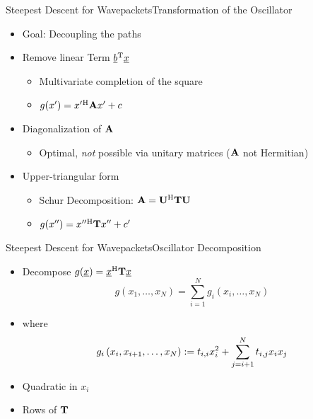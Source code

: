 \documentclass{beamer}
\newcommand{\cemph}[1]{\emph{\color{orange} #1}}
\begin{document}
\begin{frame}{Steepest Descent for Wavepackets}{Transformation of the Oscillator}
  \begin{itemize}
    \item Goal: Decoupling the paths
    \vspace{0.3cm}
    \item Remove linear Term $\underline{b}{}^{\textnormal{T}} \underline{x}$
    \begin{itemize}
      \item Multivariate completion of the square
      \item $g(x^\prime) = x^\prime{}^{\textnormal{H}} \mathbf{A} x^\prime + c$
    \end{itemize}
    \item Diagonalization of $\mathbf{A}$
    \begin{itemize}
      \item Optimal, \cemph{not} possible via unitary matrices ($\mathbf{A}$ not Hermitian)
    \end{itemize}
    \item Upper-triangular form
    \begin{itemize}
      \item Schur Decomposition: $\mathbf{A} = \mathbf{U}{}^{\textnormal{H}} \mathbf{T} \mathbf{U}$
      \item $g(x^{\prime\prime}) = x^{\prime\prime}{}^{\textnormal{H}} \mathbf{T} x^{\prime\prime} + c^{\prime}$
    \end{itemize}
  \end{itemize}
\end{frame}


\begin{frame}{Steepest Descent for Wavepackets}{Oscillator Decomposition}
  \begin{itemize}
    \item Decompose $g(\underline{x}) = \underline{x}{}^{\textnormal{H}}\mathbf{T}\underline{x}$
    \begin{equation*}
      g\left(x_1, \ldots, x_N\right) = \sum_{i=1}^N g_i(x_i, \ldots, x_N)
    \end{equation*}
    \item where
    \begin{equation*}
      g_i\left(x_i, x_{i+1}, \ldots, x_N\right)
      := t_{i,i} x_i^2 + \sum_{j=i+1}^{N} t_{i,j} x_i x_j
    \end{equation*}
    \item Quadratic in $x_{i}$
    \item Rows of $\mathbf{T}$
  \end{itemize}
\end{frame}
\end{document}
